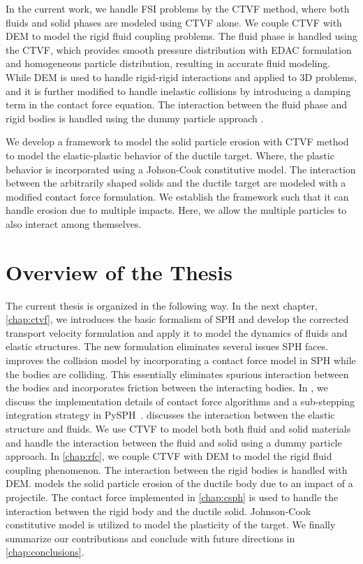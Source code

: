 In the current work, we handle FSI problems by the CTVF method, where both
fluids and solid phases are modeled using CTVF alone. We couple CTVF with DEM to
model the rigid fluid coupling problems. The fluid phase is handled using the
CTVF, which provides smooth pressure distribution with EDAC formulation and
homogeneous particle distribution, resulting in accurate fluid modeling. While
DEM is used to handle rigid-rigid interactions and applied to 3D problems, and
it is further modified to handle inelastic collisions by introducing a damping
term in the contact force equation. The interaction between the fluid phase and
rigid bodies is handled using the dummy particle approach \citep{Adami2012}.

We develop a framework to model the solid particle erosion with CTVF method to
model the elastic-plastic behavior of the ductile target. Where, the plastic
behavior is incorporated using a Johson-Cook constitutive model. The interaction
between the arbitrarily shaped solids and the ductile target are modeled with a
modified contact force formulation. We establish the framework such that it can
handle erosion due to multiple impacts. Here, we allow the multiple particles
to also interact among themselves.


\section{Overview of the Thesis}
The current thesis is organized in the following way. In the next chapter,
\cref{chap:ctvf}, we introduces the basic formalism of SPH and develop the
corrected transport velocity formulation and apply it to model the dynamics of
fluids and elastic structures. The new formulation eliminates several issues SPH
faces.  improves the collision model by incorporating a contact
force model in SPH while the bodies are colliding. This essentially eliminates
spurious interaction between the bodies and incorporates friction between the
interacting bodies. In , we discuss the
implementation details of contact force algorithms and a sub-stepping
integration strategy in PySPH~\citep{pysph2020}.  discusses the
interaction between the elastic structure and fluids. We use CTVF to model both
both fluid and solid materials and handle the interaction between the fluid and
solid using a dummy particle approach. In \cref{chap:rfc}, we couple CTVF with
DEM to model the rigid fluid coupling phenomenon. The interaction between the
rigid bodies is handled with DEM.  models the solid particle
erosion of the ductile body due to an impact of a projectile. The contact
force implemented in \cref{chap:csph} is used to handle the interaction between
the rigid body and the ductile solid. Johnson-Cook constitutive model is
utilized to model the plasticity of the target. We finally summarize our
contributions and conclude with future directions in \cref{chap:conclusions}.


